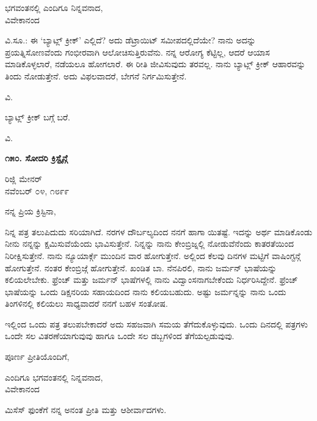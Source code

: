 \begin{flushright}
ಭಗವಂತನಲ್ಲಿ ಎಂದಿಗೂ ನಿನ್ನವನಾದ,\\ವಿವೇಕಾನಂದ
\end{flushright}

ವಿ.ಸೂ.: ಈ ‘ಬ್ಯಾಟ್ಲ್ ಕ್ರೀಕ್’ ಎಲ್ಲಿದೆ? ಅದು ಡೆಟ್ರಾಯಿಟ್ ಸಮೀಪದಲ್ಲಿದೆಯೇ? ನಾನು ಅದನ್ನು ಪ್ರಯತ್ನಿಸೋಣವೆಂದು ಗಂಭೀರವಾಗಿ ಆಲೋಚಿಸುತ್ತಿರುವೆನು. ನನ್ನ ಆರೋಗ್ಯ ಕೆಟ್ಟಿಲ್ಲ, ಆದರೆ ಆಯಾಸ ಮಾಡಿಕೊಳ್ಳಲಾರೆ, ನಡೆಯಲೂ ಹೋಗಲಾರೆ. ಈ ರೀತಿ ಜೀವಿಸುವುದು ತರವಲ್ಲ. ನಾನು ಬ್ಯಾಟ್ಲ್ ಕ್ರೀಕ್ ಆಹಾರವನ್ನು ತಿಂದು ನೋಡುತ್ತೇನೆ. ಅದು ವಿಫಲವಾದರೆ, ಬೇಗನೆ ನಿರ್ಗಮಿಸುತ್ತೇನೆ.

\begin{flushright}
ವಿ.
\end{flushright}

ಬ್ಯಾಟ್ಲ್ ಕ್ರೀಕ್ ಬಗ್ಗೆ ಬರೆ.

\begin{flushright}
ವಿ.
\end{flushright}

\begin{center}
\textbf{೧೫೦. ಸೋದರಿ ಕ್ರಿಸ್ಟೈನ್ಗೆ}
\end{center}

\begin{flushright}
ರಿಜ್ಲಿ ಮೇನರ್\\ನವೆಂಬರ್ ೦೪, ೧೮೯೯
\end{flushright}

ನನ್ನ ಪ್ರಿಯ ಕ್ರಿಸ್ಟಿನಾ,

ನಿನ್ನ ಪತ್ರ ತಲುಪಿದುದು ಸರಿಯಾಗಿದೆ. ನರಗಳ ದೌರ್ಬಲ್ಯದಿಂದ ನನಗೆ ಹಾಗಾ ಯಿತಷ್ಟೆ. ಇದನ್ನು ಅರ್ಥ ಮಾಡಿಕೊಂಡು ನೀನು ನನ್ನನ್ನು ಕ್ಷಮಿಸುವೆಯೆಂದು ಭಾವಿಸುತ್ತೇನೆ. ನಿನ್ನನ್ನು ನಾನು ಕೇಂಬ್ರಿಜ್ನಲ್ಲಿ ನೋಡುವೆನೆಂದು ಕಾತರತೆಯಿಂದ ನಿರೀಕ್ಷಿಸುತ್ತೇನೆ. ನಾನು ನ್ಯೂಯಾರ್ಕ್ಗೆ ಮುಂದಿನ ವಾರ ಹೋಗುತ್ತೇನೆ. ಅಲ್ಲಿಂದ ಕೆಲವು ದಿನಗಳ ಮಟ್ಟಿಗೆ ವಾಷಿಂಗ್ಟನ್ಗೆ ಹೋಗುತ್ತೇನೆ. ನಂತರ ಕೇಂಬ್ರಿಜ್ಗೆ ಹೋಗುತ್ತೇನೆ. ಖಂಡಿತ ಬಾ. ನೆನಪಿರಲಿ, ನಾನು ಜರ್ಮನ್ ಭಾಷೆಯನ್ನು ಕಲಿಯಲೇಬೇಕು. ಫ್ರೆಂಚ್ ಮತ್ತು ಜರ್ಮನ್ ಭಾಷೆಗಳಲ್ಲಿ ನಾನು ವಿದ್ವಾಂಸನಾಗಬೇಕೆಂದು ನಿರ್ಧರಿಸಿದ್ದೇನೆ. ಫ್ರೆಂಚ್ ಭಾಷೆಯನ್ನು ಒಂದು ಡಿಕ್ಷನರಿಯ ಸಹಾಯದಿಂದ ನಾನು ಕಲಿಯಬಹುದು. ಅಷ್ಟು ಜರ್ಮನ್ನನ್ನು ನಾನು ಒಂದು ತಿಂಗಳಿನಲ್ಲಿ ಕಲಿಯಲು ಸಾಧ್ಯವಾದರೆ ನನಗೆ ಬಹಳ ಸಂತೋಷ.

ಇಲ್ಲಿಂದ ಒಂದು ಪತ್ರ ತಲುಪಬೇಕಾದರೆ ಅದು ಸಹಜವಾಗಿ ಸಮಯ ತೆಗೆದುಕೊಳ್ಳುವುದು. ಒಂದು ದಿನದಲ್ಲಿ ಪತ್ರಗಳು ಒಂದೇ ಸಲ ವಿತರಣೆಯಾಗುವುವು ಹಾಗೂ ಒಂದೇ ಸಲ ಡಬ್ಬಗಳಿಂದ ತೆಗೆಯಲ್ಪಡುವುವು.

ಪೂರ್ಣ ಪ್ರೀತಿಯೊಂದಿಗೆ,

\begin{flushright}
ಎಂದಿಗೂ ಭಗವಂತನಲ್ಲಿ ನಿನ್ನವನಾದ,\\ವಿವೇಕಾನಂದ
\end{flushright}

ಮಿಸೆಸ್ ಫುಂಕೆಗೆ ನನ್ನ ಅನಂತ ಪ್ರೀತಿ ಮತ್ತು ಆಶೀರ್ವಾದಗಳು.

